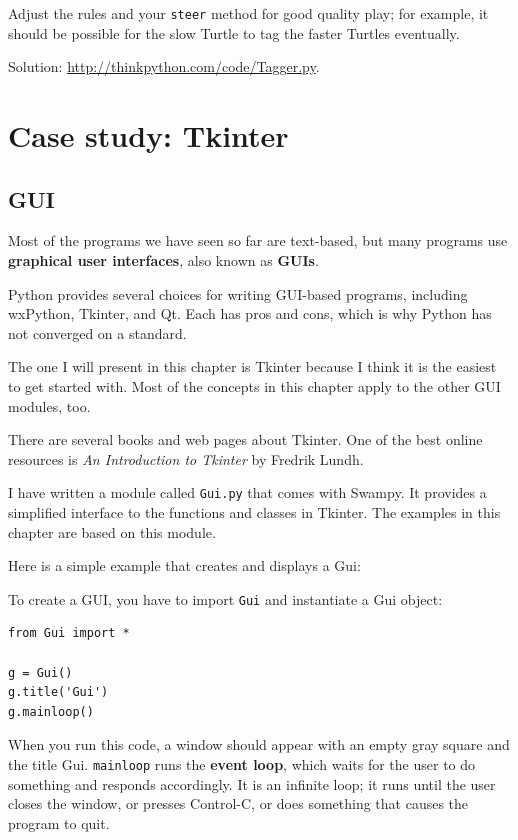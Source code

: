 \documentclass[10pt]{book}
\begin{document}
\begin{CJK}{UTF8}{gbsn}
\begin{exercise}
\begin{enumerate}
Adjust the rules and your {\tt steer} method for good quality play;
for example, it should be possible for the slow Turtle to tag the
faster Turtles eventually.

\end{enumerate}

Solution: \url{http://thinkpython.com/code/Tagger.py}.
\end{exercise}



\chapter{Case study: Tkinter}
\label{tkinter}

\section{GUI}

Most of the programs we have seen so far are text-based, but
many programs use {\bf graphical user interfaces}, also
known as {\bf GUIs}.

Python provides several choices for writing GUI-based programs,
including wxPython, Tkinter, and Qt.  Each has pros and cons, which
is why Python has not converged on a standard.

The one I will present in this chapter is Tkinter because I think
it is the easiest to get started with.  Most of the concepts
in this chapter apply to the other GUI modules, too.

There are several books and web pages about Tkinter.  One of
the best online resources is {\em An Introduction to Tkinter}
by Fredrik Lundh.

I have written a module called {\tt Gui.py} that comes with
Swampy.  It provides a simplified interface to the functions
and classes in Tkinter.  The examples in this chapter are
based on this module.

Here is a simple example that creates and displays a Gui:

To create a GUI, you have to import {\tt Gui} and instantiate
a Gui object:

\begin{verbatim}
from Gui import *

g = Gui()
g.title('Gui')
g.mainloop()
\end{verbatim}
%
When you run this code, a window should appear with an empty gray
square and the title {\sf Gui}.  {\tt mainloop} runs the {\bf event
  loop}, which waits for the user to do something and responds
accordingly.  It is an infinite loop; it runs until the user closes
the window, or presses Control-C, or does something that causes the
program to quit.


\end{CJK}
\end{document}
